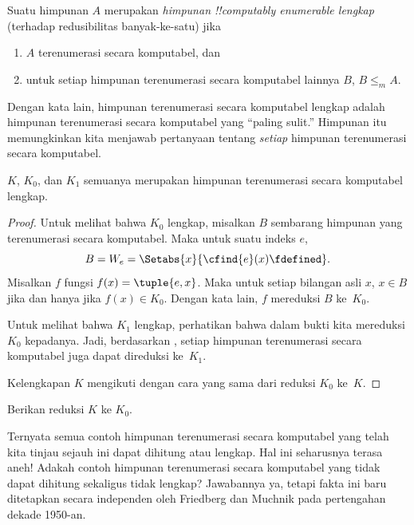 \documentclass[../../../include/open-logic-section]{subfiles}
\begin{document}

\begin{defn}
Suatu himpunan $A$ merupakan \emph{himpunan !!{computably enumerable}
lengkap} (terhadap redusibilitas banyak-ke-satu) jika
\begin{enumerate}
\item $A$ terenumerasi secara komputabel, dan
\item untuk setiap himpunan terenumerasi secara komputabel lainnya $B$,
  $B \leq_m A$.
\end{enumerate}
\end{defn}

Dengan kata lain, himpunan terenumerasi secara komputabel lengkap adalah
himpunan terenumerasi secara komputabel yang ``paling sulit.'' Himpunan itu
memungkinkan kita menjawab pertanyaan tentang \emph{setiap} himpunan
terenumerasi secara komputabel.

\begin{thm}
$K$, $K_0$, dan $K_1$ semuanya merupakan himpunan terenumerasi secara
komputabel lengkap.
\end{thm}

\begin{proof}
Untuk melihat bahwa $K_0$ lengkap, misalkan $B$ sembarang himpunan yang
terenumerasi secara komputabel. Maka untuk suatu indeks $e$,
\[
B = W_e = \Setabs{x}{\cfind{e}(x) \fdefined}.
\]
Misalkan $f$ fungsi $f(x) = \tuple{e, x}$. Maka untuk setiap bilangan asli
$x$, $x \in B$ jika dan hanya jika $f(x) \in K_0$. Dengan kata lain, $f$
mereduksi $B$ ke~$K_0$.

Untuk melihat bahwa $K_1$ lengkap, perhatikan bahwa dalam bukti
 kita mereduksi $K_0$ kepadanya. Jadi, berdasarkan
, setiap himpunan terenumerasi secara komputabel juga
dapat direduksi ke~$K_1$.

Kelengkapan $K$ mengikuti dengan cara yang sama dari reduksi $K_0$ ke~$K$.
\end{proof}

\begin{prob}
Berikan reduksi $K$ ke $K_0$.
\end{prob}

\begin{digress}
Ternyata semua contoh himpunan terenumerasi secara komputabel yang telah kita
tinjau sejauh ini dapat dihitung atau lengkap. Hal ini seharusnya terasa
aneh!{} Adakah contoh himpunan terenumerasi secara komputabel yang tidak dapat
dihitung sekaligus tidak lengkap? Jawabannya ya, tetapi fakta ini baru
ditetapkan secara independen oleh Friedberg dan Muchnik pada pertengahan
dekade 1950-an.
\end{digress}
\end{document}
